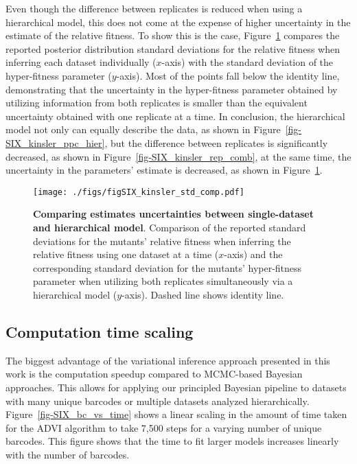 \documentclass[
]{scrartcl}
\begin{document}
\begin{refsegment}
\begin{figure}
\end{figure}

Even though the difference between replicates is reduced when using a
hierarchical model, this does not come at the expense of higher
uncertainty in the estimate of the relative fitness. To show this is the
case, Figure~\ref{fig-SIX_kinsler_std_comp} compares the reported
posterior distribution standard deviations for the relative fitness when
inferring each dataset individually (\(x\)-axis) with the standard
deviation of the hyper-fitness parameter (\(y\)-axis). Most of the
points fall below the identity line, demonstrating that the uncertainty
in the hyper-fitness parameter obtained by utilizing information from
both replicates is smaller than the equivalent uncertainty obtained with
one replicate at a time. In conclusion, the hierarchical model not only
can equally describe the data, as shown in
Figure~\ref{fig-SIX_kinsler_ppc_hier}, but the difference between
replicates is significantly decreased, as shown in
Figure~\ref{fig-SIX_kinsler_rep_comb}, at the same time, the uncertainty
in the parameters' estimate is decreased, as shown in
Figure~\ref{fig-SIX_kinsler_std_comp}.

\begin{figure}

{\centering \texttt{[image: ./figs/figSIX\_kinsler\_std\_comp.pdf]}

}

\caption{\label{fig-SIX_kinsler_std_comp}\textbf{Comparing estimates
uncertainties between single-dataset and hierarchical model}. Comparison
of the reported standard deviations for the mutants' relative fitness
when inferring the relative fitness using one dataset at a time
(\(x\)-axis) and the corresponding standard deviation for the mutants'
hyper-fitness parameter when utilizing both replicates simultaneously
via a hierarchical model (\(y\)-axis). Dashed line shows identity line.}

\end{figure}

\hypertarget{sec-scaling}{%
\subsection{Computation time scaling}\label{sec-scaling}}

The biggest advantage of the variational inference approach presented in
this work is the computation speedup compared to MCMC-based Bayesian
approaches. This allows for applying our principled Bayesian pipeline to
datasets with many unique barcodes or multiple datasets analyzed
hierarchically. Figure~\ref{fig-SIX_bc_vs_time} shows a linear scaling
in the amount of time taken for the ADVI algorithm to take 7,500 steps
for a varying number of unique barcodes. This figure shows that the time
to fit larger models increases linearly with the number of barcodes.


\end{refsegment}
\end{document}
